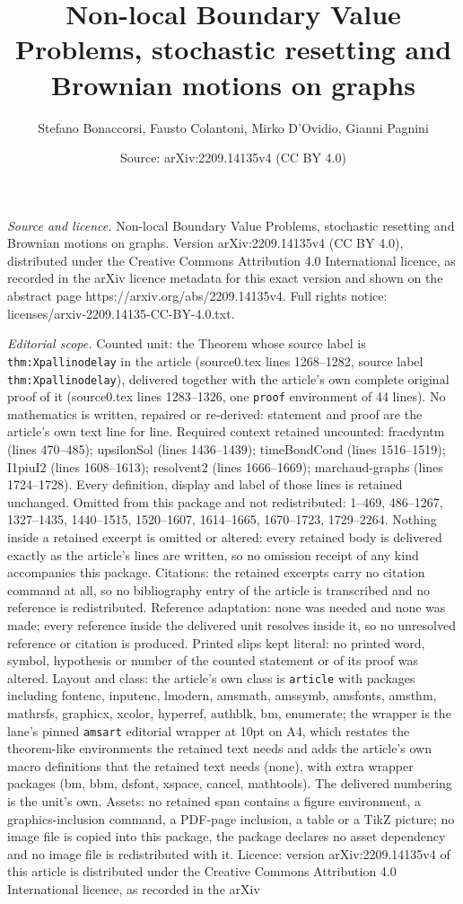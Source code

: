 \documentclass[10pt,a4paper]{amsart}
\title[Non-local Boundary Value Problems, stochastic resetting and ]{Non-local Boundary Value Problems, stochastic resetting and Brownian motions on graphs}
\author{Stefano Bonaccorsi, Fausto Colantoni, Mirko D'Ovidio, Gianni Pagnini}
\date{Source: arXiv:2209.14135v4 (CC BY 4.0)}
\begin{document}
\maketitle

\noindent\emph{Source and licence.} Non-local Boundary Value Problems, stochastic resetting and Brownian motions on graphs. Version arXiv:2209.14135v4 (CC BY 4.0), distributed under the Creative Commons Attribution 4.0 International licence, as recorded in the arXiv licence metadata for this exact version and shown on the abstract page https://arxiv.org/abs/2209.14135v4. Full rights notice: licenses/arxiv-2209.14135-CC-BY-4.0.txt.\par\smallskip

\noindent\textit{Editorial scope.} Counted unit: the Theorem whose source label is \texttt{thm:Xpallinodelay} in the article (source0.tex lines 1268--1282, source label \texttt{thm:Xpallinodelay}), delivered together with the article's own complete original proof of it (source0.tex lines 1283--1326, one \texttt{proof} environment of 44 lines). No mathematics is written, repaired or re-derived: statement and proof are the article's own text line for line. Required context retained uncounted: fracdyntm (lines 470--485); upsilonSol (lines 1436--1439); timeBondCond (lines 1516--1519); I1piuI2 (lines 1608--1613); resolvent2 (lines 1666--1669); marchaud-graphs (lines 1724--1728). Every definition, display and label of those lines is retained unchanged. Omitted from this package and not redistributed: 1--469, 486--1267, 1327--1435, 1440--1515, 1520--1607, 1614--1665, 1670--1723, 1729--2264. Nothing inside a retained excerpt is omitted or altered: every retained body is delivered exactly as the article's lines are written, so no omission receipt of any kind accompanies this package. Citations: the retained excerpts carry no citation command at all, so no bibliography entry of the article is transcribed and no reference is redistributed. Reference adaptation: none was needed and none was made; every reference inside the delivered unit resolves inside it, so no unresolved reference or citation is produced. Printed slips kept literal: no printed word, symbol, hypothesis or number of the counted statement or of its proof was altered. Layout and class: the article's own class is \texttt{article} with packages including fontenc, inputenc, lmodern, amsmath, amssymb, amsfonts, amsthm, mathrsfs, graphicx, xcolor, hyperref, authblk, bm, enumerate; the wrapper is the lane's pinned \texttt{amsart} editorial wrapper at 10pt on A4, which restates the theorem-like environments the retained text needs and adds the article's own macro definitions that the retained text needs (none), with extra wrapper packages (bm, bbm, dsfont, xspace, cancel, mathtools). The delivered numbering is the unit's own. Assets: no retained span contains a figure environment, a graphics-inclusion command, a PDF-page inclusion, a table or a TikZ picture; no image file is copied into this package, the package declares no asset dependency and no image file is redistributed with it. Licence: version arXiv:2209.14135v4 of this article is distributed under the Creative Commons Attribution 4.0 International licence, as recorded in the arXiv 
\end{document}
